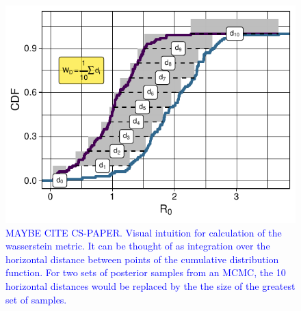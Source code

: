 \documentclass{article}
\begin{document}
{%

\renewcommand{\thefigure}{S\arabic{figure}}
\setcounter{figure}{0}

\begin{figure}[H]
\centering
\includegraphics[width=0.5\linewidth]{../figures/wassersteinIntuition.pdf}
\caption{\textcolor{blue}{ MAYBE CITE CS-PAPER. Visual intuition for calculation of the wasserstein metric. It can be thought of as integration over the horizontal distance between points of the cumulative distribution function. For two sets of posterior samples from an MCMC, the 10 horizontal distances would be replaced by the the size of the greatest set of samples.}}
\label{fig:wassIntuition}
\end{figure}

}
\end{document}
